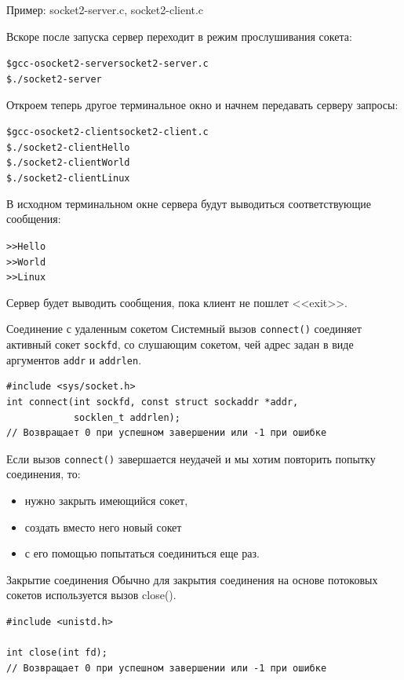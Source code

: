 \documentclass{beamer}
\begin{document}
\begin{frame}[fragile]
	Пример: socket2-server.c, socket2-client.c

	Вскоре после запуска сервер переходит в режим прослушивания сокета:
	\begin{alltt}
	\$ gcc -o socket2-server socket2-server.c
	\$ ./socket2-server
	\end{alltt}
	Откроем теперь другое терминальное окно и начнем передавать серверу запросы:
	\begin{alltt}
	\$ gcc -o socket2-client socket2-client.c
	\$ ./socket2-client Hello
	\$ ./socket2-client World
	\$ ./socket2-client Linux
	\end{alltt}	
	В исходном терминальном окне сервера будут выводиться соответствующие сообщения:
	\begin{alltt}
	>> Hello
	>> World
	>> Linux
	\end{alltt}	
	Сервер будет выводить сообщения, пока клиент не пошлет <<exit>>.
\end{frame}

\begin{frame}[fragile]{Соединение с удаленным сокетом}
    Системный вызов \texttt{connect()} соединяет активный сокет \texttt{sockfd}, со слушающим сокетом, чей адрес задан в виде аргументов \texttt{addr} и \texttt{addrlen}.
    
\begin{verbatim}
#include <sys/socket.h>
int connect(int sockfd, const struct sockaddr *addr, 
            socklen_t addrlen);
// Возвращает 0 при успешном завершении или -1 при ошибке
\end{verbatim}
        	
    Если вызов \texttt{connect()} завершается неудачей и мы хотим повторить попытку соединения, то:
    \begin{itemize}
    	\item нужно закрыть имеющийся сокет, 
    	\item создать вместо него новый сокет 
    	\item с его помощью попытаться соединиться еще раз.
    \end{itemize}    
\end{frame}

\begin{frame}[fragile]{Закрытие соединения}
    Обычно для закрытия соединения на основе потоковых сокетов используется вызов close().

\begin{verbatim}
#include <unistd.h>

int close(int fd);
// Возвращает 0 при успешном завершении или -1 при ошибке
\end{verbatim}
\end{frame}
\end{document}
